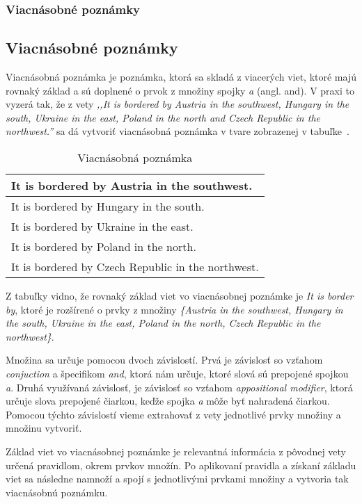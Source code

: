 %
%
{
	\subsubsection{Viacnásobné poznámky}
}
{
	\subsection{Viacnásobné poznámky}
}
Viacnásobná poznámka je poznámka, ktorá sa skladá z viacerých viet, ktoré majú rovnaký základ a sú doplnené o prvok z množiny spojky \textit{a} (angl. and). V praxi to vyzerá tak, že z vety \textit{,,It is bordered by Austria in the southwest, Hungary in the south, Ukraine in the east, Poland in the north and Czech Republic in the northwest.''} sa dá vytvoriť viacnásobná poznámka v tvare zobrazenej v tabuľke~.

\begin{table}[H]
	\centering
	\caption{Viacnásobná poznámka}
	\label{system:table:multinote}
	\begin{tabular}{|l|}
		\hline
		It is bordered by Austria in the southwest. \\ \hline
		It is bordered by Hungary in the south. \\ \hline
		It is bordered by Ukraine in the east. \\ \hline
		It is bordered by Poland in the north.\\ \hline
		It is bordered by Czech Republic in the northwest. \\ \hline
	\end{tabular}
\end{table}

Z tabuľky vidno, že rovnaký základ viet vo viacnásobnej poznámke je \textit{It is border by}, ktoré je rozšírené o prvky z množiny \textit{\{Austria in the southwest, Hungary in the south, Ukraine in the east, Poland in the north, Czech Republic in the northwest\}}.

Množina sa určuje pomocou dvoch závislostí. Prvá je závislosť so vzťahom \textit{conjuction} a špecifikom \textit{and}, ktorá nám určuje, ktoré slová sú prepojené spojkou \textit{a}. Druhá využívaná závislosť, je závislosť so vzťahom \textit{appositional modifier}, ktorá určuje slova prepojené čiarkou, keďže spojka \textit{a} môže byť nahradená čiarkou. Pomocou týchto závislostí vieme extrahovať z vety jednotlivé prvky množiny a množinu vytvoriť.

Základ viet vo viacnásobnej poznámke je relevantná informácia z pôvodnej vety určená pravidlom, okrem prvkov množín. Po aplikovaní pravidla a získaní základu viet sa následne namnoží a spojí s jednotlivými prvkami množiny a vytvoria tak viacnásobnú poznámku.

